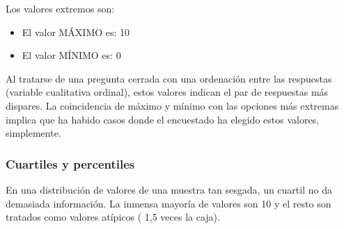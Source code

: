 \documentclass[
]{article}
\newenvironment{Shaded}{\begin{snugshade}}{\end{snugshade}}
\newcommand{\AttributeTok}[1]{\textcolor[rgb]{0.13,0.29,0.53}{#1}}
\newcommand{\CommentTok}[1]{\textcolor[rgb]{0.56,0.35,0.01}{\textit{#1}}}
\newcommand{\FloatTok}[1]{\textcolor[rgb]{0.00,0.00,0.81}{#1}}
\newcommand{\FunctionTok}[1]{\textcolor[rgb]{0.13,0.29,0.53}{\textbf{#1}}}
\newcommand{\NormalTok}[1]{#1}
\newcommand{\OtherTok}[1]{\textcolor[rgb]{0.56,0.35,0.01}{#1}}
\newcommand{\SpecialCharTok}[1]{\textcolor[rgb]{0.81,0.36,0.00}{\textbf{#1}}}
\newcommand{\StringTok}[1]{\textcolor[rgb]{0.31,0.60,0.02}{#1}}
\providecommand{\tightlist}{%
  \setlength{\itemsep}{0pt}\setlength{\parskip}{0pt}}
\begin{document}
Los valores extremos son:

\begin{itemize}
\tightlist
\item
  El valor MÁXIMO es: 10
\item
  El valor MÍNIMO es: 0
\end{itemize}

Al tratarse de una pregunta cerrada con una ordenación entre las
respuestas (variable cualitativa ordinal), estos valores indican el par
de respuestas más dispares. La coincidencia de máximo y mínimo con las
opciones más extremas implica que ha habido casos donde el encuestado ha
elegido estos valores, simplemente.

\hypertarget{cuartiles-y-percentiles}{%
\subsubsection{Cuartiles y percentiles}\label{cuartiles-y-percentiles}}

En una distribución de valores de una muestra tan sesgada, un cuartil no
da demasiada información. La inmensa mayoría de valores son 10 y el
resto son tratados como valores atípicos ( 1,5 veces la caja).

\begin{Shaded}
\end{Shaded}
\end{document}
